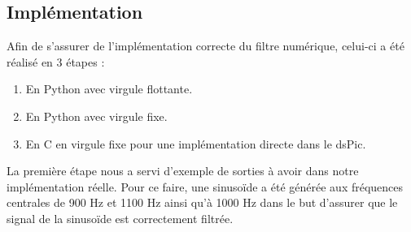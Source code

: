\subsection{Implémentation}
\label{res_filtre_num}
Afin de s'assurer de l'implémentation correcte du filtre numérique, celui-ci a été réalisé en 3 étapes :
\begin{enumerate}
\item En Python avec virgule flottante.
\item En Python avec virgule fixe.
\item En C en virgule fixe pour une implémentation directe dans le dsPic.
\end{enumerate}

La première étape nous a servi d'exemple de sorties à avoir dans notre implémentation réelle. Pour ce faire, une sinusoïde a été générée aux fréquences centrales de 900 Hz et 1100 Hz ainsi qu'à 1000 Hz dans le but d'assurer que le signal de la sinusoïde est correctement filtrée.
